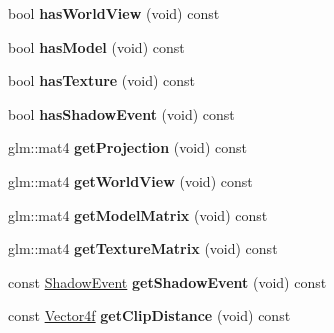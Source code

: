\begin{DoxyCompactItemize}
\item 
\hypertarget{classEngine_1_1DrawEvent_a4c447f0dfeeb19b3f169811049d9ba58}{}bool {\bfseries has\+World\+View} (void) const \label{classEngine_1_1DrawEvent_a4c447f0dfeeb19b3f169811049d9ba58}

\item 
\hypertarget{classEngine_1_1DrawEvent_ae975d9472c0d02e6731ecd01a1327c09}{}bool {\bfseries has\+Model} (void) const \label{classEngine_1_1DrawEvent_ae975d9472c0d02e6731ecd01a1327c09}

\item 
\hypertarget{classEngine_1_1DrawEvent_a884ca99c31d79d5cd765a85bff3794b8}{}bool {\bfseries has\+Texture} (void) const \label{classEngine_1_1DrawEvent_a884ca99c31d79d5cd765a85bff3794b8}

\item 
\hypertarget{classEngine_1_1DrawEvent_a007fe111c202dae108bc562496e4ac16}{}bool {\bfseries has\+Shadow\+Event} (void) const \label{classEngine_1_1DrawEvent_a007fe111c202dae108bc562496e4ac16}

\item 
\hypertarget{classEngine_1_1DrawEvent_afc81c272b1e7e6c1adf3d5d3ee6adb63}{}glm\+::mat4 {\bfseries get\+Projection} (void) const \label{classEngine_1_1DrawEvent_afc81c272b1e7e6c1adf3d5d3ee6adb63}

\item 
\hypertarget{classEngine_1_1DrawEvent_a3d65f9a9295f26adf94ffc003de97212}{}glm\+::mat4 {\bfseries get\+World\+View} (void) const \label{classEngine_1_1DrawEvent_a3d65f9a9295f26adf94ffc003de97212}

\item 
\hypertarget{classEngine_1_1DrawEvent_a523c4294c0e1508221bbb5764632c84f}{}glm\+::mat4 {\bfseries get\+Model\+Matrix} (void) const \label{classEngine_1_1DrawEvent_a523c4294c0e1508221bbb5764632c84f}

\item 
\hypertarget{classEngine_1_1DrawEvent_af8d338da327a48180c5e03de0d938db6}{}glm\+::mat4 {\bfseries get\+Texture\+Matrix} (void) const \label{classEngine_1_1DrawEvent_af8d338da327a48180c5e03de0d938db6}

\item 
\hypertarget{classEngine_1_1DrawEvent_a7e677deb5c6903be0501da7bbee21dd2}{}const \hyperlink{classEngine_1_1ShadowEvent}{Shadow\+Event} {\bfseries get\+Shadow\+Event} (void) const \label{classEngine_1_1DrawEvent_a7e677deb5c6903be0501da7bbee21dd2}

\item 
\hypertarget{classEngine_1_1DrawEvent_adb6ff5576ad0b323cfe6fb6931ffa96d}{}const \hyperlink{classVector4}{Vector4f} {\bfseries get\+Clip\+Distance} (void) const \label{classEngine_1_1DrawEvent_adb6ff5576ad0b323cfe6fb6931ffa96d}

\end{DoxyCompactItemize}


